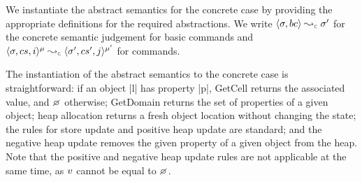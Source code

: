 We instantiate the abstract semantics for the concrete case by providing the appropriate definitions 
for the required abstractions.
We write $\absbsemrule{\jstate, \bcmd}{\jstate'}{\concrete}$ for the concrete semantic 
judgement for \jsil basic commands and $\abssemrule{\jstate, \cs, i}{\jstate', \cs', j}{\mode}{\mode'}{\concrete}$ 
for \jsil commands. 

The instantiation of the \jsil abstract semantics to the concrete case is straightforward: if an object \jsinline|l| has property \jsinline|p|, GetCell returns the associated value, and $\none$ otherwise; GetDomain returns the set of properties of a given object;
heap allocation returns a fresh object location without changing the state;
the rules for store update and positive heap update are standard; and 
the negative heap update removes the given property of a given object from the heap.
Note that the positive and negative heap update rules are not applicable at the same time, as $v$ cannot be equal to $\none$. 

